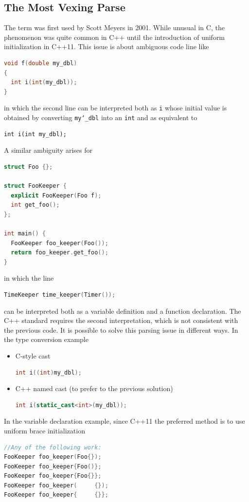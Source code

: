 \subsection{The Most Vexing Parse}
\label{subsubsec:most-vex-parse}
The term  was first used by Scott Meyers 
in 2001. While unusual in C, the phenomenon was quite common in C++ until 
the introduction of uniform initialization in C++11.
\newline
This issue is about ambiguous code line like
\begin{lstlisting}[language=C++]
void f(double my_dbl)
{
  int i(int(my_dbl));
}
\end{lstlisting}
in which the second line can be interpreted both as  \texttt{i} whose initial value is obtained by converting 
\texttt{my\char`_dbl} into an \texttt{int} and as  
equivalent to
\begin{lstlisting}[]
int i(int my_dbl);
\end{lstlisting} 
A similar ambiguity arises for 
\begin{lstlisting}[language=C++]
struct Foo {};

struct FooKeeper {
  explicit FooKeeper(Foo f);
  int get_foo();
};

int main() {
  FooKeeper foo_keeper(Foo());
  return foo_keeper.get_foo();
}
\end{lstlisting}
in which the line
\begin{lstlisting}[language=C++]
TimeKeeper time_keeper(Timer());    
\end{lstlisting}
can be interpreted both as a variable definition and a function 
declaration. The C++ standard requires the second interpretation, which 
is not consistent with the previous code.
It is possible to solve this parsing issue in different ways.
\newline
In the type conversion example
\begin{itemize}
    \item C-style cast
    \begin{lstlisting}[language=C++]
    int i((int)my_dbl);
    \end{lstlisting}
    
    \item C++ named cast (to prefer to the previous solution)
    \begin{lstlisting}[language=C++]
    int i(static_cast<int>(my_dbl));
    \end{lstlisting} 
\end{itemize}
In the variable declaration example, since C++11 the preferred method is 
to use uniform brace initialization
\begin{lstlisting}[language=C++]
//Any of the following work:
FooKeeper foo_keeper(Foo{});
FooKeeper foo_keeper{Foo()};
FooKeeper foo_keeper{Foo{}};
FooKeeper foo_keeper(     {});
FooKeeper foo_keeper{     {}};
\end{lstlisting}


